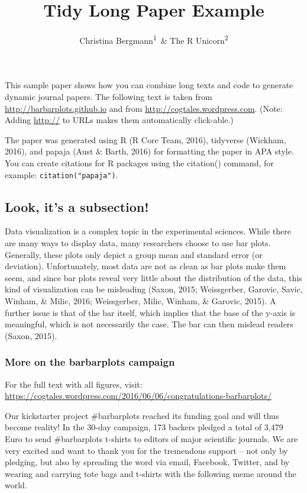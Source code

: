 \documentclass[english,floatsintext,man]{apa6}
\title{Tidy Long Paper Example}
\author{Christina Bergmann\textsuperscript{1}~\& The R Unicorn\textsuperscript{2}}
\affiliation{
    \vspace{0.5cm}
          \textsuperscript{1} Ecole Normale Superieure\\
          \textsuperscript{2} Institute for Rainbow Studies  }
\begin{document}
\maketitle

\setcounter{secnumdepth}{0}



This sample paper shows how you can combine long texts and code to
generate dynamic journal papers. The following text is taken from
\url{http://barbarplots.github.io} and from
\url{http://cogtales.wordpress.com}. (Note: Adding \url{http://} to URLs
makes them automatically click-able.)

The paper was generated using R (R Core Team, 2016), tidyverse (Wickham,
2016), and papaja (Aust \& Barth, 2016) for formatting the paper in APA
style. You can create citations for R packages using the citation()
command, for example: \texttt{citation("papaja")}.

\subsection{Look, it's a subsection!}\label{look-its-a-subsection}

Data visualization is a complex topic in the experimental sciences.
While there are many ways to display data, many researchers choose to
use bar plots. Generally, these plots only depict a group mean and
standard error (or deviation). Unfortunately, most data are not as clean
as bar plots make them seem, and since bar plots reveal very little
about the distribution of the data, this kind of visualization can be
misleading (Saxon, 2015; Weissgerber, Garovic, Savic, Winham, \& Milic,
2016; Weissgerber, Milic, Winham, \& Garovic, 2015). A further issue is
that of the bar itself, which implies that the base of the y-axis is
meaningful, which is not necessarily the case. The bar can then mislead
readers (Saxon, 2015).

\subsubsection{More on the barbarplots
campaign}\label{more-on-the-barbarplots-campaign}

For the full text with all figures, visit:
\url{https://cogtales.wordpress.com/2016/06/06/congratulations-barbarplots/}

Our kickstarter project \#barbarplots reached its funding goal and will
thus become reality! In the 30-day campaign, 173 backers pledged a total
of 3,479 Euro to send \#barbarplots t-shirts to editors of major
scientific journals. We are very excited and want to thank you for the
tremendous support -- not only by pledging, but also by spreading the
word via email, Facebook, Twitter, and by wearing and carrying tote bags
and t-shirts with the following meme around the world.
\end{document}
